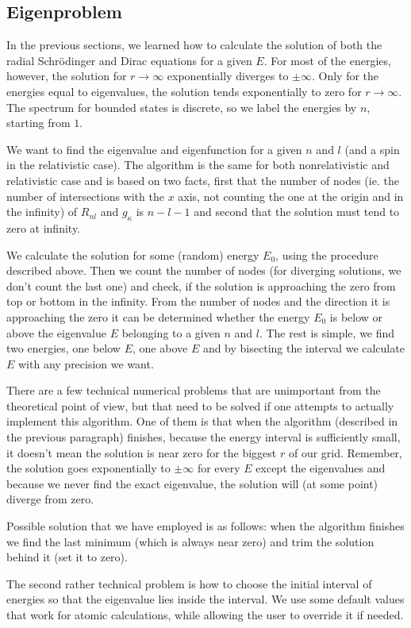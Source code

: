 \subsection{Eigenproblem}

In the previous sections, we learned how to calculate the solution of both the radial Schrödinger and Dirac equations for a given $E$. For most of the energies, however, the solution for $r\to\infty$ exponentially diverges to $\pm\infty$. Only for the energies equal to eigenvalues, the solution tends exponentially to zero for $r\to\infty$. The spectrum for bounded states is discrete, so we label the energies by $n$, starting from $1$.

We want to find the eigenvalue and eigenfunction for a given $n$ and $l$ (and a spin in the relativistic case). The algorithm is the same for both nonrelativistic and relativistic case and is based on two facts, first that the number of nodes (ie. the number of intersections with the $x$ axis, not counting the one at the origin and in the infinity) of $R_{nl}$ and $g_\kappa$ is $n-l-1$ and second that the solution must tend to zero at infinity.

We calculate the solution for some (random) energy $E_0$, using the procedure described above. Then we count the number of nodes (for diverging solutions, we don't count the last one) and check, if the solution is approaching the zero from top or bottom in the infinity. From the number of nodes and the direction it is approaching the zero it can be determined whether the energy $E_0$ is below or above the eigenvalue $E$ belonging to a given $n$ and $l$. The rest is simple, we find two energies, one below $E$, one above $E$ and by bisecting the interval we calculate $E$ with any precision we want.

There are a few technical numerical problems that are unimportant from the theoretical point of view, but that need to be solved if one attempts to actually implement this algorithm. One of them is that when the algorithm (described in the previous paragraph) finishes, because the energy interval is sufficiently small, it doesn't mean the solution is near zero for the biggest $r$ of our grid. Remember, the solution goes exponentially to $\pm\infty$ for every $E$ except the eigenvalues and because we never find the exact eigenvalue, the solution will (at some point) diverge from zero.

Possible solution that we have employed is as follows: when the algorithm finishes we find the last minimum (which is always near zero) and trim the solution behind it (set it to zero).

The second rather technical problem is how to choose the initial interval of energies so that the eigenvalue lies inside the interval. We use some default values that work for atomic calculations, while allowing the user to override it if needed.
